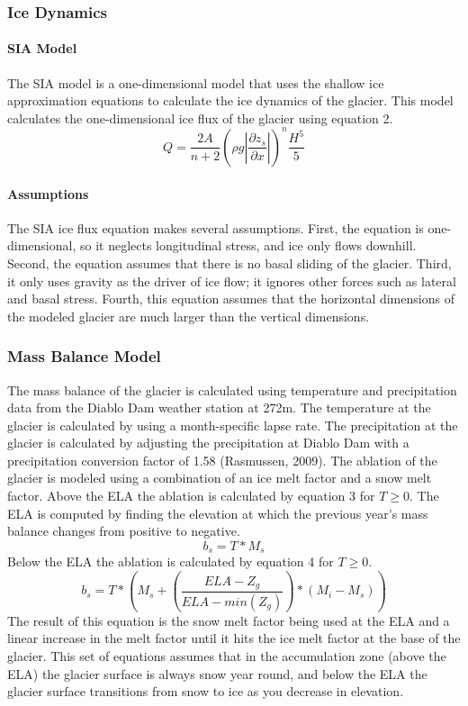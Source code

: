 \documentclass{article}
\begin{document}
\subsubsection{Ice Dynamics}
\paragraph{SIA Model}
The SIA model is a one-dimensional model that uses the shallow ice approximation equations to calculate the ice dynamics of the glacier. This model 
calculates the one-dimensional ice flux of the glacier using equation 2. 
\begin{equation}Q=\frac{2A}{n+2}(\rho g|\frac{\partial z_s}{\partial x}|)^n\frac{H^5}{5}\label{tab:ice_dyn_eq}\end{equation}

\paragraph{Assumptions}
The SIA ice flux equation makes several assumptions. First, the equation is one-dimensional, so it neglects longitudinal stress, and ice only 
flows downhill. Second, the equation assumes that there is no basal sliding of the glacier. Third, it only uses gravity as the 
driver of ice flow; it ignores other forces such as lateral and basal stress. Fourth, this equation assumes that the horizontal 
dimensions of the modeled glacier are much larger than the vertical dimensions.

\subsubsection{Mass Balance Model}
The mass balance of the glacier is calculated using temperature and precipitation data from the Diablo Dam weather station at 272m. The 
temperature at the glacier is calculated by using a month-specific lapse rate. 
The precipitation at the glacier is calculated by adjusting the precipitation at Diablo Dam with a precipitation conversion factor of 1.58 
(Rasmussen, 2009). The ablation of the glacier is modeled using a combination of an ice melt factor and a snow melt factor. Above the ELA
the ablation is calculated by equation 3 for $T\geq0$. The ELA is computed by finding the elevation at which the previous year's mass balance 
changes from positive to negative.
\begin{equation}b_s=T*M_{s}\label{tab:summer_mb_below_ela_eq}\end{equation}
Below the ELA the ablation is calculated by equation 4 for $T\geq0$.
\begin{equation}b_s=T*(M_{s}+\left(\frac{ELA-Z_g}{ELA-min(Z_g)}\right)*(M_{i}-M_{s}))\label{tab:summer_mb_above_ela_eq}\end{equation}
The result of this equation is the snow melt factor being used at the ELA and a linear increase in the melt factor until it hits the ice melt 
factor at the base of the glacier. This set of equations assumes that in the accumulation zone (above the ELA) the glacier surface is always snow year 
round, and below the ELA the glacier surface transitions from snow to ice as you decrease in elevation.
\end{document}
